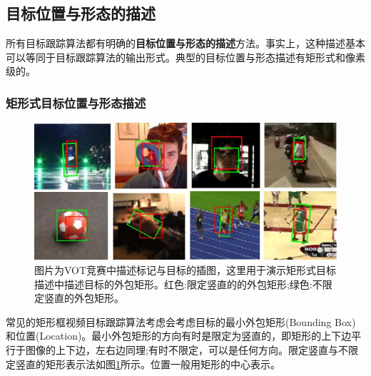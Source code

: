 \subsection{目标位置与形态的描述} 
所有目标跟踪算法都有明确的\textbf{目标位置与形态的描述}方法。事实上，这种描述基本可以等同于目标跟踪算法的输出形式。典型的目标位置与形态描述有矩形式和像素级的。
\par
\subsubsection{矩形式目标位置与形态描述}
\par
\begin{figure}[htbp!]
    \centering
    \includegraphics[width = 1.\textwidth]{chap/img/overlap_examples.pdf}
    \caption{图片为VOT竞赛中描述标记与目标的插图\supercite{VOT_TPAMI}，这里用于演示矩形式目标描述中描述目标的外包矩形。红色:限定竖直的的外包矩形;绿色:不限定竖直的外包矩形。}
    \label{fig:bunding_boxes}
\end{figure}
\par
常见的矩形框视频目标跟踪算法考虑会考虑目标的最小外包矩形(Bounding Box)和位置(Location)。最小外包矩形的方向有时是限定为竖直的，即矩形的上下边平行于图像的上下边，左右边同理;有时不限定，可以是任何方向。限定竖直与不限定竖直的矩形表示法如图\ref{fig:bunding_boxes}所示。位置一般用矩形的中心表示。
\par
